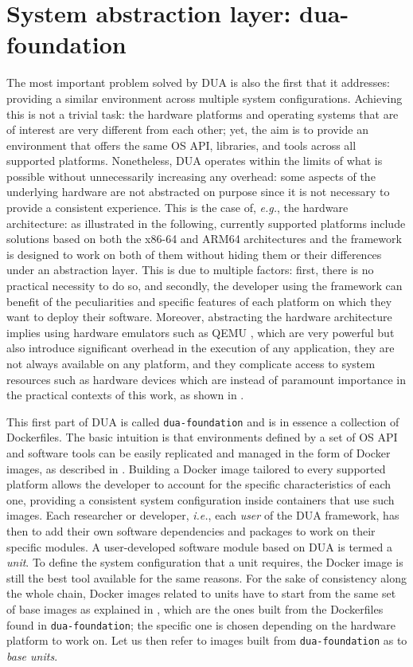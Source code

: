 \section{System abstraction layer: dua-foundation}
\label{sec:dua_foundation}
The most important problem solved by DUA is also the first that it addresses: providing a similar environment across multiple system configurations. Achieving this is not a trivial task: the hardware platforms and operating systems that are of interest are very different from each other; yet, the aim is to provide an environment that offers the same OS API, libraries, and tools across all supported platforms. Nonetheless, DUA operates within the limits of what is possible without unnecessarily increasing any overhead: some aspects of the underlying hardware are not abstracted on purpose since it is not necessary to provide a consistent experience. This is the case of, \emph{e.g.}, the hardware architecture: as illustrated in the following, currently supported platforms include solutions based on both the x86-64 and ARM64 architectures and the framework is designed to work on both of them without hiding them or their differences under an abstraction layer. This is due to multiple factors: first, there is no practical necessity to do so, and secondly, the developer using the framework can benefit of the peculiarities and specific features of each platform on which they want to deploy their software. Moreover, abstracting the hardware architecture implies using hardware emulators such as QEMU \cite{bellard_qemu_nodate}, which are very powerful but also introduce significant overhead in the execution of any application, they are not always available on any platform, and they complicate access to system resources such as hardware devices which are instead of paramount importance in the practical contexts of this work, as shown in .

This first part of DUA is called \texttt{dua-foundation} \cite{masocco_dua-foundation_nodate} and is in essence a collection of Dockerfiles. The basic intuition is that environments defined by a set of OS API and software tools can be easily replicated and managed in the form of Docker images, as described in . Building a Docker image tailored to every supported platform allows the developer to account for the specific characteristics of each one, providing a consistent system configuration inside containers that use such images. Each researcher or developer, \emph{i.e.}, each \emph{user} of the DUA framework, has then to add their own software dependencies and packages to work on their specific modules. A user-developed software module based on DUA is termed a \emph{unit}. To define the system configuration that a unit requires, the Docker image is still the best tool available for the same reasons. For the sake of consistency along the whole chain, Docker images related to units have to start from the same set of base images as explained in , which are the ones built from the Dockerfiles found in \texttt{dua-foundation}; the specific one is chosen depending on the hardware platform to work on. Let us then refer to images built from \texttt{dua-foundation} as to \emph{base units}.


